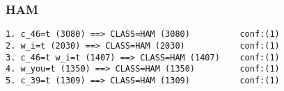 \subsubsection{HAM}

\begin{verbatim}
1. c_46=t (3080) ==> CLASS=HAM (3080)          conf:(1)
2. w_i=t (2030) ==> CLASS=HAM (2030)           conf:(1)
3. c_46=t w_i=t (1407) ==> CLASS=HAM (1407)    conf:(1)
4. w_you=t (1350) ==> CLASS=HAM (1350)         conf:(1)
5. c_39=t (1309) ==> CLASS=HAM (1309)          conf:(1)
\end{verbatim}
